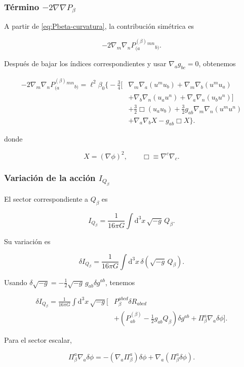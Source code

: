 \documentclass{beamer}
\renewcommand{\dd}{\mathrm{d}}
\newcommand{\Eq}[1]{\eqref{#1}}
\begin{document}
\begin{frame}[label=nav-frame-110]
\frametitle{Término \(-2\nabla\nabla P_\beta\)}
\scriptsize

A partir de \Eq{eq:Pbeta-curvatura}, la contribución simétrica es

\[
-2\nabla_m\nabla_n
P^{(\beta)}_{(a}{}^{mn}{}_{b)}.
\]

Después de bajar los índices correspondientes y usar
\(\nabla_a g_{bc}=0\), obtenemos

\begin{equation}
\boxed{
\begin{aligned}
-2\nabla_m\nabla_n
P^{(\beta)}_{(a}{}^{mn}{}_{b)}
=
\ell^2\beta_0\Bigg\{
-\frac34\Big[
&
\nabla_m\nabla_a(u^m u_b)
+
\nabla_m\nabla_b(u^m u_a)
\\
&+
\nabla_b\nabla_n(u_a u^n)
+
\nabla_a\nabla_n(u_b u^n)
\Big]
\\
&+
\frac32\Box(u_a u_b)
+
\frac32g_{ab}\nabla_m\nabla_n(u^m u^n)
\\
&+
\nabla_a\nabla_bX
-
g_{ab}\Box X
\Bigg\}.
\end{aligned}
}
\label{eq:nablanabla-Pbeta}
\end{equation}

donde

\[
X=(\nabla\phi)^2,
\qquad
\Box\equiv\nabla^c\nabla_c.
\]

\end{frame}

\begin{frame}[label=nav-frame-111]
\frametitle{Variación de la acción \(I_{Q_\beta}\)}
\small

El sector correspondiente a \(Q_\beta\) es

\[
I_{Q_\beta}
=
\frac{1}{16\pi G}
\int\dd^3x\,\sqrt{-g}\,Q_\beta.
\]

Su variación es

\[
\delta I_{Q_\beta}
=
\frac{1}{16\pi G}
\int\dd^3x\,
\delta(\sqrt{-g}\,Q_\beta).
\]

Usando $\delta\sqrt{-g} = -\frac12\sqrt{-g}\,g_{ab}\delta g^{ab}$, tenemos

\[
\begin{aligned}
\delta I_{Q_\beta}
=
\frac{1}{16\pi G}
\int\dd^3x\,\sqrt{-g}
\Big[
&
P_\beta^{abcd}\delta R_{abcd}
\\
&+
\left(
P^{(\beta)}_{ab}
-\frac12g_{ab}Q_\beta
\right)\delta g^{ab}
+
\Pi_\beta^a\nabla_a\delta\phi
\Big].
\end{aligned}
\]

Para el sector escalar,

\[
\Pi_\beta^a\nabla_a\delta\phi
=
-(\nabla_a\Pi_\beta^a)\delta\phi
+
\nabla_a(\Pi_\beta^a\delta\phi).
\]

\end{frame}
\end{document}

